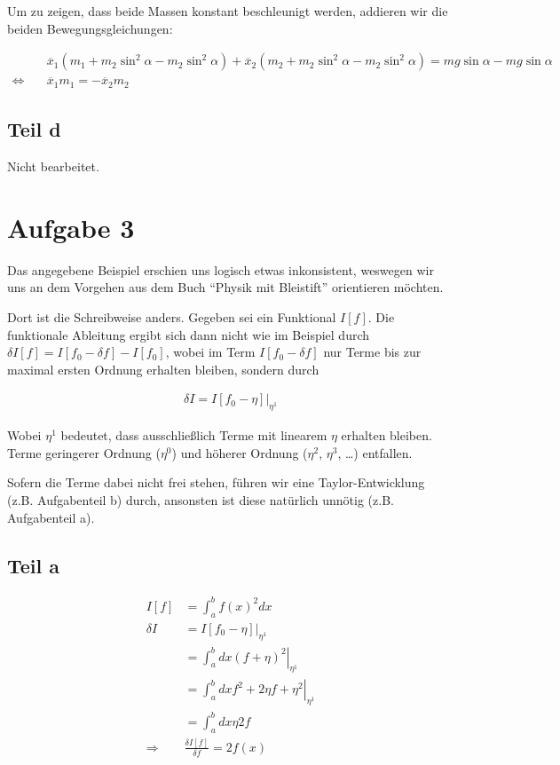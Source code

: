 \documentclass[a4paper,german,12pt,smallheadings]{scrartcl}
\begin{document}
Um zu zeigen, dass beide Massen konstant beschleunigt werden, addieren wir die beiden Bewegungsgleichungen:

\begin{align*}
&\ddot{x_1}(m_1+m_2 \sin^2 \alpha -m_2 \sin^2 \alpha)+\ddot{x_2}(m_2+m_2 \sin^2 \alpha - m_2 \sin^2 \alpha)=mg \sin \alpha - mg \sin \alpha \\
\Leftrightarrow\quad & \ddot{x_1} m_1 = -\ddot{x_2} m_2
\end{align*}



\subsection*{Teil d}
Nicht bearbeitet.

\section*{Aufgabe 3}
Das angegebene Beispiel erschien uns logisch etwas inkonsistent, weswegen wir
uns an dem Vorgehen aus dem Buch ``Physik mit Bleistift'' orientieren möchten.

Dort ist die Schreibweise anders. Gegeben sei ein Funktional $I[f]$. Die
funktionale Ableitung ergibt sich dann nicht wie im Beispiel durch $\delta I[f]
= I[f_0 - \delta f] - I[f_0]$, wobei im Term $I[f_0 - \delta f]$ nur Terme bis
zur maximal ersten Ordnung erhalten bleiben, sondern durch

\begin{align*}
  \delta I = \left.I[f_0 - \eta]\right|_{\eta^1}
\end{align*}

Wobei $\eta^1$ bedeutet, dass ausschließlich Terme mit linearem $\eta$ erhalten
bleiben. Terme geringerer Ordnung ($\eta^0$) und höherer Ordnung ($\eta^2$,
$\eta^3$, \dots) entfallen.

Sofern die Terme dabei nicht frei stehen, führen wir eine Taylor-Entwicklung
(z.B. Aufgabenteil b) durch, ansonsten ist diese natürlich unnötig (z.B.
Aufgabenteil a).

\subsection*{Teil a}

\begin{align*}
  I[f] &= \int_a^b f(x)^2 dx \\
  \delta I &= \left.I[f_0 - \eta]\right|_{\eta^1} \\
  &=\left.\int_a^b dx (f+\eta)^2 \right|_{\eta^1} \\
  &=\left.\int_a^b dx f^2 + 2 \eta f + \eta^2 \right|_{\eta^1} \\
  &=\int_a^b dx \eta 2 f \\
  \Rightarrow& \frac{\delta I[f]}{\delta f} = 2f(x)
\end{align*}
\end{document}
